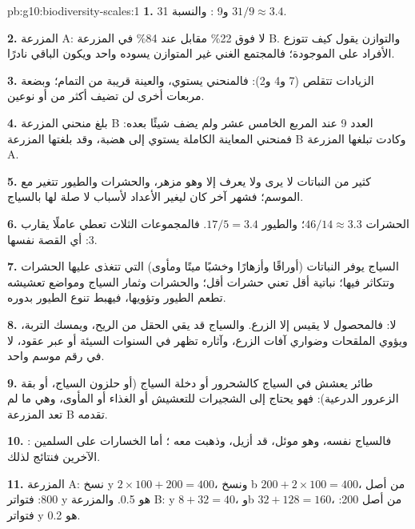 \begin{solution}{pb:g10:biodiversity-scales:1}
\textbf{1.} 31 و9 : والنسبة $31/9 \approx 3.4$.

\textbf{2.} المزرعة A: لا  فوق 22\% مقابل  عند 84\% في المزرعة
B. والتوازن يقول كيف تتوزع الأفراد على  الموجودة؛ فالمجتمع
الغني غير المتوازن يسوده  واحد ويكون الباقي نادرًا.

\textbf{3.} الزيادات تتقلص (7 و4 و2): فالمنحني يستوي، والعينة قريبة من
التمام؛ وبضعة مربعات أخرى لن تضيف أكثر من  أو نوعين.

\textbf{4.} بلغ منحني المزرعة B العدد 9 عند المربع الخامس عشر ولم يضف
شيئًا بعده: فمنحني المعاينة الكاملة يستوي إلى هضبة، وقد بلغتها
المزرعة B وكادت تبلغها المزرعة A.

\textbf{5.} كثير من النباتات لا يرى ولا يعرف إلا وهو مزهر، والحشرات
والطيور تتغير مع الموسم؛ فشهر آخر كان ليغير الأعداد لأسباب لا صلة لها
بالسياج.

\textbf{6.} الحشرات $46/14 \approx 3.3$؛ والطيور $17/5 = 3.4$.
فالمجموعات الثلاث تعطي عاملًا يقارب 3: أي القصة نفسها.

\textbf{7.} السياج يوفر النباتات (أوراقًا وأزهارًا وخشبًا ميتًا
ومأوى) التي تتغذى عليها الحشرات وتتكاثر فيها؛  نباتية أقل تعني
 حشرات أقل؛ والحشرات وثمار السياج ومواضع تعشيشه تطعم الطيور
وتؤويها، فيهبط تنوع الطيور بدوره.

\textbf{8.} لا: فالمحصول لا يقيس إلا الزرع. والسياج قد يقي الحقل من
الريح، ويمسك التربة، ويؤوي الملقحات وضواري آفات الزرع، وآثاره تظهر في
السنوات السيئة أو عبر عقود، لا في رقم موسم واحد.

\textbf{9.} طائر يعشش في السياج كالشحرور أو دخلة السياج (أو حلزون
السياج، أو بقة الزعرور الدرعية): فهو يحتاج إلى الشجيرات للتعشيش أو
الغذاء أو المأوى، وهي ما لم تعد المزرعة B تقدمه.

\textbf{10.} : فالسياج نفسه، وهو موئل، قد أزيل، وذهبت
معه  ؛ أما الخسارات على السلمين الآخرين فنتائج لذلك.

\textbf{11.} المزرعة A: نسخ y $2 \times 100 + 200 = 400$، ونسخ b
$200 + 2 \times 100 = 400$، من أصل 800: فتواتر y هو 0.5. والمزرعة B:
y $8 + 32 = 40$، وb $32 + 128 = 160$، من أصل 200: فتواتر y هو 0.2.


\end{solution}
